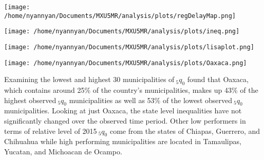 \documentclass[a0,portrait]{a0poster}
\begin{document}
\begin{multicols}{2}
%
\begin{center}\vspace{1cm}
\texttt{[image: /home/nyannyan/Documents/MXU5MR/analysis/plots/regDelayMap.png]}
\end{center}\vspace{1cm}
%

%
\begin{center}\vspace{1cm}
\texttt{[image: /home/nyannyan/Documents/MXU5MR/analysis/plots/ineq.png]}
\end{center}\vspace{1cm}
%

%
\begin{center}\vspace{1cm}
\texttt{[image: /home/nyannyan/Documents/MXU5MR/analysis/plots/lisaplot.png]}
\end{center}\vspace{1cm}
%

%
\begin{center}\vspace{1cm}
\texttt{[image: /home/nyannyan/Documents/MXU5MR/analysis/plots/Oaxaca.png]}
\end{center}\vspace{1cm}
%

Examining the lowest and highest 30 municipalities of$~_{5}q_{0}$ found that Oaxaca, which contains around 25\% of the country's municipalities, makes up 43\% of the highest observed$~_{5}q_{0}$ municipalities as well as 53\% of the lowest observed$~_{5}q_{0}$ municipalities. Looking at just Oaxaca, the state level inequalities have not significantly changed over the observed time period. Other low performers in terms of relative level of 2015$~_{5}q_{0}$ come from the states of Chiapas, Guerrero, and Chihuahua while high performing municipalities are located in Tamaulipas, Yucatan, and Michoacan de Ocampo.

\color{black} %


\end{multicols}
\end{document}
